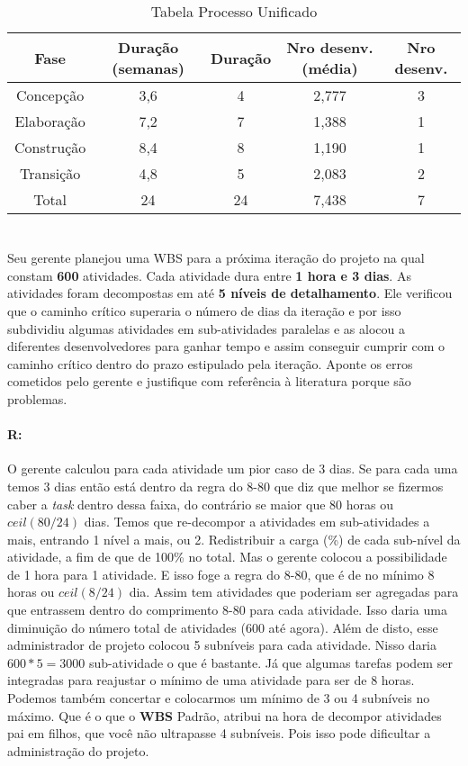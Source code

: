 \documentclass[10pt, a4paper]{report}
\begin{document}
\begin{table}[ht!]
\centering
\begin{tabular}{|c|c|c|c|c|}
\hline Fase & Duração (semanas) & Duração & Nro desenv. (média) & Nro desenv. \\ 
\hline Concepção & 3,6 & 4 & 2,777  & 3 \\ 
\hline Elaboração & 7,2 & 7 & 1,388  & 1 \\ 
\hline Construção & 8,4 & 8 & 1,190  & 1 \\ 
\hline Transição & 4,8 & 5 & 2,083  & 2 \\ 
\hline Total & 24 & 24 & 7,438  & 7 \\ 
\hline
\end{tabular}
\caption{Tabela Processo Unificado}
\end{table}

\section{}

\qquad Seu gerente planejou uma WBS para a próxima iteração do projeto na qual
constam \textbf{600} atividades. Cada atividade dura entre \textbf{1 hora e 3
dias}. As atividades foram decompostas em até \textbf{5 níveis de detalhamento}.
Ele verificou que o caminho crítico superaria o número de dias da iteração e por
isso subdividiu algumas atividades em sub-atividades paralelas e as alocou a
diferentes desenvolvedores para ganhar tempo e assim conseguir cumprir com o
caminho crítico dentro do prazo estipulado pela iteração. Aponte os erros
cometidos pelo gerente e justifique com referência à literatura porque são
problemas.


\paragraph{R:}

O gerente calculou para cada atividade um pior caso de 3 dias. Se para cada uma
temos 3 dias então está dentro da regra do 8-80 que diz que melhor se fizermos
caber a \textit{task} dentro dessa faixa, do contrário se maior que 80 horas ou
$ceil(80/24)$ dias. Temos que re-decompor a atividades em sub-atividades a mais,
entrando 1 nível a mais, ou 2. Redistribuir a carga (\%) de cada sub-nível da
atividade, a fim de que de 100\% no total. Mas o gerente colocou a possibilidade
de 1 hora para 1 atividade. E isso foge a regra do 8-80, que é de no mínimo 8
horas ou $ceil(8/24)$ dia. Assim tem atividades que poderiam ser agregadas para
que entrassem dentro do comprimento 8-80 para cada atividade. Isso daria uma
diminuição do número total de atividades (600 até agora). Além de disto, esse
administrador de projeto colocou 5 subníveis para cada atividade. Nisso daria
$600*5=3000$ sub-atividade o que é bastante. Já que algumas tarefas podem ser
integradas para reajustar o mínimo de uma atividade para ser de 8 horas. Podemos
também concertar e colocarmos um mínimo de 3 ou 4 subníveis no máximo. Que é o
que o \textbf{WBS} Padrão, atribui na hora de decompor atividades pai em filhos,
que você não ultrapasse 4 subníveis. Pois isso pode dificultar a administração
do projeto.
\end{document}
